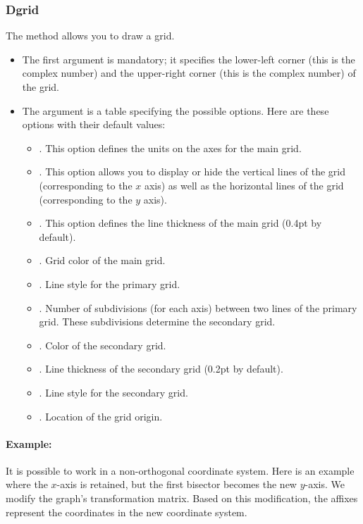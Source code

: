 \subsubsection{Dgrid}

The  method allows you to draw a grid.
\begin{itemize}
    \item The first argument is mandatory; it specifies the lower-left corner (this is the  complex number) and the upper-right corner (this is the  complex number) of the grid.
    \item The  argument is a table specifying the possible options. Here are these options with their default values:
\begin{itemize}
    \item {}. ​​This option defines the units on the axes for the main grid.
    \item {}. This option allows you to display or hide the vertical lines of the grid (corresponding to the $x$ axis) as well as the horizontal lines of the grid (corresponding to the $y$ axis).
    \item {}. This option defines the line thickness of the main grid (0.4pt by default).
    \item {}. Grid color of the main grid.
    \item {}. Line style for the primary grid.
    \item {}. Number of subdivisions (for each axis) between two lines of the primary grid. These subdivisions determine the secondary grid.
    \item {}. Color of the secondary grid.
    \item {}. Line thickness of the secondary grid (0.2pt by default).
    \item {}. Line style for the secondary grid.
    \item {}. Location of the grid origin.
\end{itemize}
\end{itemize}

\paragraph{Example:} It is possible to work in a non-orthogonal coordinate system. Here is an example where the $x$-axis is retained, but the first bisector becomes the new $y$-axis. We modify the graph's transformation matrix. Based on this modification, the affixes represent the coordinates in the new coordinate system.

